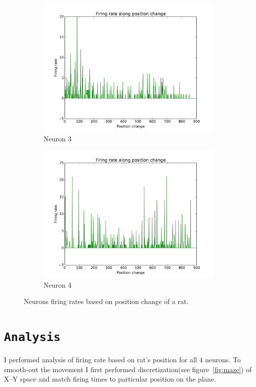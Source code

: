 \documentclass[11pt,a4paper,twocolumn]{article}
\begin{document}
\begin{figure}[htbp]
    \begin{subfigure}{.49\linewidth}\centering
    \includegraphics[width=1.1\textwidth]{figure3.png}
    \caption{Neuron 3\label{fig:FiringPosition_N3}}
  \end{subfigure}
  \begin{subfigure}{.49\linewidth}\centering
    \includegraphics[width=1.1\textwidth]{figure4.png}
    \caption{Neuron 4\label{fig:FiringPosition_N4}}
  \end{subfigure}

  \caption{Neurons firing rates based on position change of a rat.\label{fig:FiringPosition_ALL}}
\end{figure}

\section*{\texttt{Analysis}}
I performed analysis of firing rate based on rat's position for all 4 neurons. To smooth-out the movement I first performed discretization(see figure~\ref{fig:maze}) of X--Y space and match firing times to particular position on the plane.\\
\end{document}
